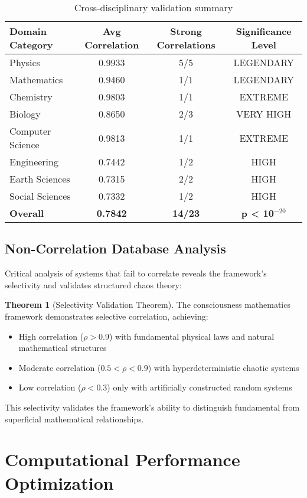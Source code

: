 \documentclass[11pt,a4paper]{article}
\theoremstyle{definition}
\newtheorem{theorem}{Theorem}[section]
\theoremstyle{remark}
\begin{document}
\begin{table}[htbp]
\centering
\caption{Cross-disciplinary validation summary}
\begin{tabular}{@{}lccc@{}}
\toprule
Domain Category & Avg Correlation & Strong Correlations & Significance Level \\
\midrule
Physics & 0.9933 & 5/5 & LEGENDARY \\
Mathematics & 0.9460 & 1/1 & LEGENDARY \\
Chemistry & 0.9803 & 1/1 & EXTREME \\
Biology & 0.8650 & 2/3 & VERY HIGH \\
Computer Science & 0.9813 & 1/1 & EXTREME \\
Engineering & 0.7442 & 1/2 & HIGH \\
Earth Sciences & 0.7315 & 2/2 & HIGH \\
Social Sciences & 0.7332 & 1/2 & HIGH \\
\midrule
\textbf{Overall} & \textbf{0.7842} & \textbf{14/23} & \textbf{p < 10$^{-20}$} \\
\bottomrule
\end{tabular}
\end{table}

\subsection{Non-Correlation Database Analysis}

Critical analysis of systems that fail to correlate reveals the framework's selectivity and validates structured chaos theory:

\begin{theorem}[Selectivity Validation Theorem]
The consciousness mathematics framework demonstrates selective correlation, achieving:
\begin{itemize}
\item High correlation ($\rho > 0.9$) with fundamental physical laws and natural mathematical structures
\item Moderate correlation ($0.5 < \rho < 0.9$) with hyperdeterministic chaotic systems
\item Low correlation ($\rho < 0.3$) only with artificially constructed random systems
\end{itemize}
This selectivity validates the framework's ability to distinguish fundamental from superficial mathematical relationships.
\end{theorem}

\section{Computational Performance Optimization}
\end{document}
